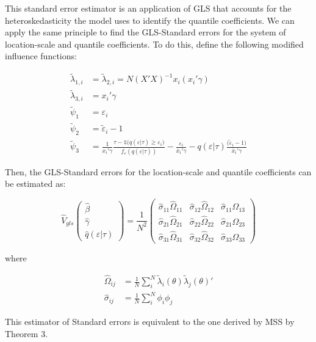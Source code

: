 \documentclass[
  authoryear,
  preprint,
  1p]{elsarticle}
\begin{document}
This standard error estimator is an application of GLS that accounts for
the heteroskedasticity the model uses to identify the quantile
coefficients. We can apply the same principle to find the GLS-Standard
errors for the system of location-scale and quantile coefficients. To do
this, define the following modified influence functions:

\[\begin{aligned}
\tilde \lambda_{1,i}&=\tilde \lambda_{2,i}=N (X'X)^{-1}  x_i ( x_i'\gamma) \\  
\tilde \lambda_{3,i}&=x_i' \gamma  \\
\tilde \psi_1 &= \varepsilon_i \\
\tilde \psi_2 &= \tilde \varepsilon_i -1 \\
\tilde \psi_3 &= \frac{1}{ x_i' \gamma }\frac{\tau-\mathbb{1}\big( q(\varepsilon|\tau)  \geq \varepsilon_i  \big) }{ f_{\varepsilon}(q(\varepsilon|\tau))} - \frac{\varepsilon_i }{\bar x_i'\gamma} 
-  q(\varepsilon|\tau) \frac{(\tilde \varepsilon_i -1\big)}{\bar x_i'\gamma}
\end{aligned}
\]

Then, the GLS-Standard errors for the location-scale and quantile
coefficients can be estimated as:

\[\hat{V}_{gls}
  \begin{pmatrix}
  \hat\beta \\
  \hat\gamma \\
  \hat q(\varepsilon|\tau)
  \end{pmatrix}
 = \frac{1}{N^2} 
 \begin{pmatrix}
 \hat\sigma_{11} \hat\Omega_{11} & \hat\sigma_{12} \hat\Omega_{12} & \hat\sigma_{11} \hat\Omega_{13} \\
 \hat\sigma_{21} \hat\Omega_{21} & \hat\sigma_{22} \hat\Omega_{22} & \hat\sigma_{21} \hat\Omega_{23} \\
 \hat\sigma_{31} \hat\Omega_{31} & \hat\sigma_{32} \hat\Omega_{32} & \hat\sigma_{33} \hat\Omega_{33}
  \end{pmatrix}
\]

where

\[\begin{aligned}
\hat\Omega_{ij} &= \frac{1}{N} \sum_i^N \tilde \lambda_{i}(\theta) \tilde \lambda_{j}(\theta)' \\
\hat\sigma_{ij} &= \frac{1}{N} \sum_i^N \phi_{i} \phi_{j}
\end{aligned}
\]

This estimator of Standard errors is equivalent to the one derived by
MSS by Theorem 3.
\end{document}
